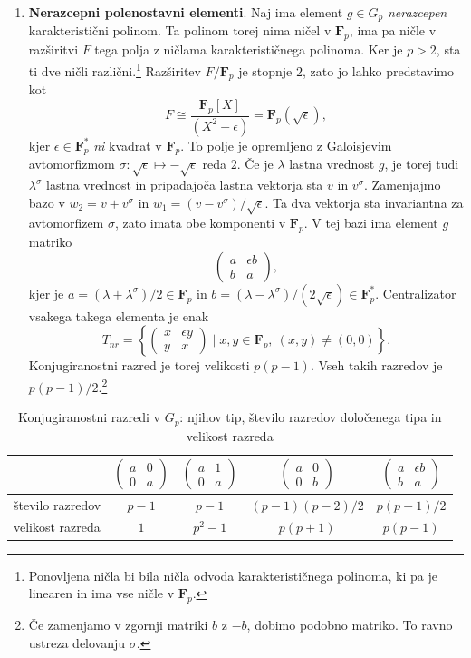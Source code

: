 \documentclass[11pt]{book}
\def\FF{\mathbf{F}}
\def\definicija{\color{rdeca}\bf}
\newcommand{\mat}[4]{\left(\begin{smallmatrix}#1&#2\\#3&#4\end{smallmatrix}\right)}
\theoremstyle{definition}
\theoremstyle{zgled}
\theoremstyle{zgledbrezstevilke}
\theoremstyle{odprtproblem}
\theoremstyle{domacanaloga}
\theoremstyle{izrek}
\begin{document}
\begin{enumerate}
    \item {\definicija Nerazcepni polenostavni elementi}. Naj ima element $g \in G_p$ \emph{nerazcepen} karakteristični polinom. Ta polinom torej nima ničel v $\FF_p$, ima pa ničle v razširitvi $F$ tega polja z ničlama karakterističnega polinoma. Ker je $p > 2$, sta ti dve ničli različni.\footnote{Ponovljena ničla bi bila ničla odvoda karakterističnega polinoma, ki pa je linearen in ima vse ničle v $\FF_p$.} Razširitev $F/\FF_p$ je stopnje $2$, zato jo lahko predstavimo kot
    \[
        F \cong \frac{\FF_p[X]}{(X^2 - \epsilon)} = \FF_p(\sqrt{\epsilon}),
    \]
    kjer $\epsilon \in \FF_p^*$ \emph{ni} kvadrat v $\FF_p$. To polje je opremljeno z Galoisjevim avtomorfizmom $\sigma \colon \sqrt{\epsilon} \mapsto - \sqrt{\epsilon}$ reda $2$. Če je $\lambda$ lastna vrednost $g$, je torej tudi $\lambda^{\sigma}$ lastna vrednost in pripadajoča lastna vektorja sta $v$ in $v^{\sigma}$. Zamenjajmo bazo v $w_2 = v + v^{\sigma}$ in $w_1 = (v - v^{\sigma})/\sqrt{\epsilon}$. Ta dva vektorja sta invariantna za avtomorfizem $\sigma$, zato imata obe komponenti v $\FF_p$. V tej bazi ima element $g$ matriko
    \[
        \begin{pmatrix}
            a & \epsilon b \\ b & a
        \end{pmatrix},
    \]
    kjer je $a = (\lambda + \lambda^{\sigma})/2 \in \FF_p$ in $b = (\lambda - \lambda^{\sigma})/(2 \sqrt{\epsilon}) \in \FF_p^*$. Centralizator vsakega takega elementa je enak
    \[
        T_{nr} = \left\{ \begin{pmatrix}
            x & \epsilon y \\ y & x
        \end{pmatrix} \mid x, y \in \FF_p, \ (x,y) \neq (0,0) \right\}.
    \]
    Konjugiranostni razred je torej velikosti $p(p-1)$. Vseh takih razredov je $p (p-1)/2$.\footnote{Če zamenjamo v zgornji matriki $b$ z $-b$, dobimo podobno matriko. To ravno ustreza delovanju $\sigma$.}
\end{enumerate}

\begin{table}[ht]
    \centering
\begin{tabular}{l*{4}{c}}
    & 
    $\mat{a}{0}{0}{a}$
    &
    $\mat{a}{1}{0}{a}$
    &
    $\mat{a}{0}{0}{b}$
    &
    $\mat{a}{\epsilon b}{b}{a}$ \\ \hline
    število razredov & $p-1$ & $p-1$ & $(p-1)(p-2)/2$ & $p(p-1)/2$ \\
    velikost razreda & $1$ & $p^2 - 1$ & $p(p+1)$ & $p(p-1)$ \\
\end{tabular}
\caption{Konjugiranostni razredi v $G_p$: njihov tip, število razredov določenega tipa in velikost razreda}
\end{table}
\end{document}
